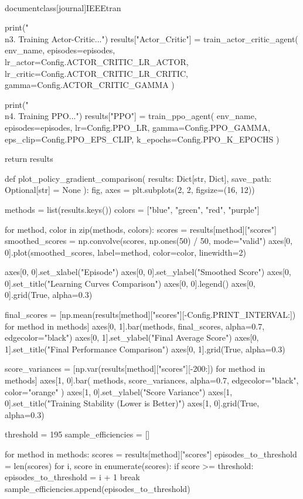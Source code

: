 \\documentclass[journal]{IEEEtran}
\begin{document}
    print("\\n3. Training Actor-Critic...")
    results["Actor_Critic"] = train_actor_critic_agent(
        env_name, episodes=episodes, lr_actor=Config.ACTOR_CRITIC_LR_ACTOR, lr_critic=Config.ACTOR_CRITIC_LR_CRITIC, gamma=Config.ACTOR_CRITIC_GAMMA
    )

    print("\\n4. Training PPO...")
    results["PPO"] = train_ppo_agent(
        env_name, episodes=episodes, lr=Config.PPO_LR, gamma=Config.PPO_GAMMA, eps_clip=Config.PPO_EPS_CLIP, k_epochs=Config.PPO_K_EPOCHS
    )

    return results


def plot_policy_gradient_comparison(
    results: Dict[str, Dict], save_path: Optional[str] = None
):
    fig, axes = plt.subplots(2, 2, figsize=(16, 12))

    methods = list(results.keys())
    colors = ["blue", "green", "red", "purple"]

    for method, color in zip(methods, colors):
        scores = results[method]["scores"]
        smoothed_scores = np.convolve(scores, np.ones(50) / 50, mode="valid")
        axes[0, 0].plot(smoothed_scores, label=method, color=color, linewidth=2)

    axes[0, 0].set_xlabel("Episode")
    axes[0, 0].set_ylabel("Smoothed Score")
    axes[0, 0].set_title("Learning Curves Comparison")
    axes[0, 0].legend()
    axes[0, 0].grid(True, alpha=0.3)

    final_scores = [np.mean(results[method]["scores"][-Config.PRINT_INTERVAL:]) for method in methods]
    axes[0, 1].bar(methods, final_scores, alpha=0.7, edgecolor="black")
    axes[0, 1].set_ylabel("Final Average Score")
    axes[0, 1].set_title("Final Performance Comparison")
    axes[0, 1].grid(True, alpha=0.3)

    score_variances = [np.var(results[method]["scores"][-200:]) for method in methods]
    axes[1, 0].bar(
        methods, score_variances, alpha=0.7, edgecolor="black", color="orange"
    )
    axes[1, 0].set_ylabel("Score Variance")
    axes[1, 0].set_title("Training Stability (Lower is Better)")
    axes[1, 0].grid(True, alpha=0.3)

    threshold = 195
    sample_efficiencies = []

    for method in methods:
        scores = results[method]["scores"]
        episodes_to_threshold = len(scores)
        for i, score in enumerate(scores):
            if score >= threshold:
                episodes_to_threshold = i + 1
                break
        sample_efficiencies.append(episodes_to_threshold)
\end{document}
